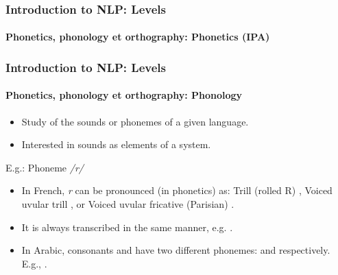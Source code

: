 \documentclass[xcolor=table]{beamer}
\begin{document}
\begin{frame}
\frametitle{Introduction to NLP: Levels}
\framesubtitle{Phonetics, phonology et orthography: Phonetics (IPA)}

\begin{center}
\end{center}

\end{frame}

\begin{frame}
\frametitle{Introduction to NLP: Levels}
\framesubtitle{Phonetics, phonology et orthography: Phonology}

\begin{itemize}
	\item Study of the sounds or phonemes of a given language.
	\item Interested in sounds as elements of a system.
\end{itemize}

\begin{exampleblock}{E.g.: Phoneme \textit{/r/}}
	\begin{itemize}
		\item In French, \textit{r} can be pronounced (in phonetics) as: Trill (rolled R) \expword{\textipa{[r]}}, Voiced uvular trill \expword{\textipa{[\;R]}}, or Voiced uvular fricative (Parisian) \expword{\textipa{[K]}}.
		\item It is always transcribed in the same manner, e.g. .
		\item In Arabic, consonants  and  have two different phonemes:  and  respectively. 
		E.g., .
	\end{itemize}
\end{exampleblock}

\end{frame}
\end{document}
